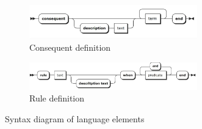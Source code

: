 \begin{figure}[!h]
    \begin{subfigure}[b]{0.9\textwidth}
        	\centering
        	\includegraphics[width=0.8\textwidth]{images/consequent}
		\caption{Consequent definition}
    \end{subfigure}
    
    \begin{subfigure}[b]{0.9\textwidth}
        	\centering
        	\includegraphics[width=0.8\textwidth]{images/rule}
		\caption{Rule definition}
    \end{subfigure}
    
	\caption{Syntax diagram of language elements}
\end{figure}

